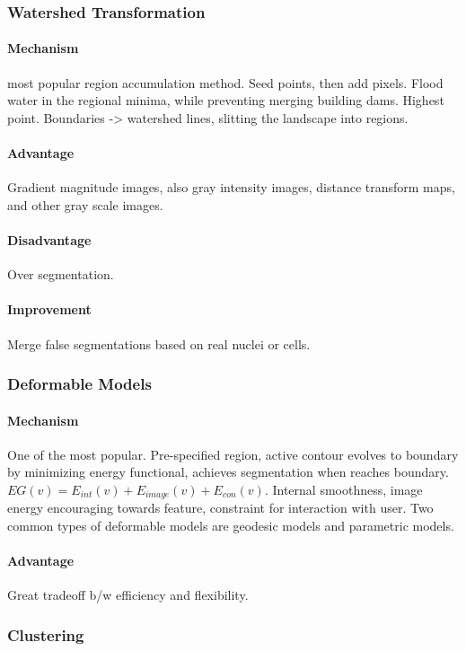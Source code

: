 \documentclass[10pt,a4paper]{article}
\begin{document}
\subsubsection{Watershed Transformation}
\paragraph{Mechanism}
most popular region accumulation method. Seed points, then add pixels. Flood water in the regional minima, while preventing merging building dams. Highest point. Boundaries -> watershed lines, slitting the landscape into regions.
\paragraph{Advantage}
Gradient magnitude images, also gray intensity images, distance transform maps, and other gray scale images.
\paragraph{Disadvantage}
Over segmentation.
\paragraph{Improvement}
Merge false segmentations based on real nuclei or cells.

\subsubsection{Deformable Models}
\paragraph{Mechanism}
One of the most popular. Pre-specified region, active contour evolves to boundary by minimizing energy functional, achieves segmentation when reaches boundary. $EG(v)=E_{int}(v)+E_{image}(v)+E_{con}(v)$. Internal smoothness, image energy encouraging towards feature, constraint for interaction with user. Two common types of deformable models are geodesic models and parametric models.
\paragraph{Advantage}
Great tradeoff b/w efficiency and flexibility. 

\subsubsection{Clustering}
\end{document}
